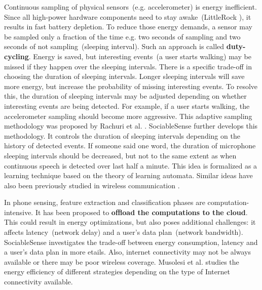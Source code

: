Continuous sampling of physical sensors\ (e.g. accelerometer) is energy inefficient. Since all high-power hardware components need to stay awake\ (LittleRock \cite{priyantha:littlerock}), it results in fast battery depletion. To reduce those energy demands, a sensor may be sampled only a fraction of the time e.g. two seconds of sampling and two seconds of not sampling\ (sleeping interval). Such an approach is called \textbf{duty-cycling}. Energy is saved, but interesting events\ (a user starts walking) may be missed if they happen over the sleeping intervals. There is a specific trade-off in choosing the duration of sleeping intervals. Longer sleeping intervals will save more energy, but increase the probability of missing interesting events. To resolve this, the duration of sleeping intervals may be adjusted depending on whether interesting events are being detected. For example, if a user starts walking, the accelerometer sampling should become more aggressive. This adaptive sampling methodology was proposed by Rachuri et al. \cite{rachuri:dynamicsensing}. SociableSense \cite{rachuri:socialsense} further develops this methodology.  It controls the duration of sleeping intervals depending on the history of detected events. If someone said one word, the duration of microphone sleeping intervals should be decreased, but not to the same extent as when continuous speech is detected over last half a minute. This idea is formalized as a learning technique based on the theory of learning automata. Similar ideas have also been previously studied in wireless communication \cite{deshpande:channeling} \cite{deshpande:refocusing} \cite{deshpande:coordinated}.

In phone sensing, feature extraction and classification phases are computation-intensive. It has been proposed to \textbf{offload the computations to the cloud}. This could result in energy optimizations, but also poses additional challenges: it affects latency\ (network delay) and a user's data plan\ (network bandwidth). SociableSense \cite{rachuri:socialsense} investigates the trade-off between energy consumption, latency and a user's data plan in more etails. Also, internet connectivity may not be always available or there may be poor wireless coverage. Musolesi et al. \cite{musolesi:offloading} studies the energy efficiency of different strategies depending on the type of Internet connectivity available. 

